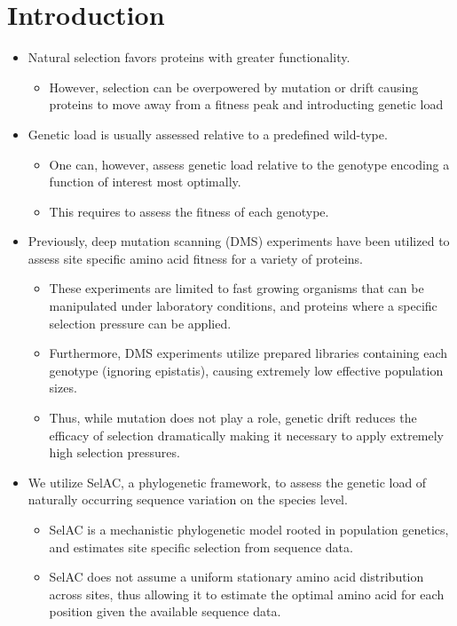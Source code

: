 \documentclass[12pt]{article}
\begin{document}
\section*{Introduction}
\begin{itemize}
	\item Natural selection favors proteins with greater functionality.
	\begin{itemize}
		\item However, selection can be overpowered by mutation or drift causing proteins to move away from a fitness peak and introducting genetic load
	\end{itemize}
	\item Genetic load is usually assessed relative to a predefined wild-type.
	\begin{itemize}
		\item One can, however, assess genetic load relative to the genotype encoding a function of interest most optimally.
		\item This requires to assess the fitness of each genotype. 
	\end{itemize}
	\item Previously, deep mutation scanning (DMS) experiments have been utilized to assess site specific amino acid fitness for a variety of proteins.
	\begin{itemize}
		\item These experiments are limited to fast growing organisms that can be manipulated under laboratory conditions, and proteins where a specific selection pressure can be applied.
		\item Furthermore, DMS experiments utilize prepared libraries containing each genotype (ignoring epistatis), causing extremely low effective population sizes. 
		\item Thus, while mutation does not play a role, genetic drift reduces the efficacy of selection dramatically making it necessary to apply extremely high selection pressures. 
	\end{itemize}
	\item We utilize SelAC, a phylogenetic framework, to assess the genetic load of naturally occurring sequence variation on the species level.
	\begin{itemize}
		\item SelAC is a mechanistic phylogenetic model rooted in population genetics, and estimates site specific selection from sequence data.
		\item SelAC does not assume a uniform stationary amino acid distribution across sites, thus allowing it to estimate the optimal amino acid for each position given the available sequence data.

\end{itemize}
\end{itemize}
\end{document}

